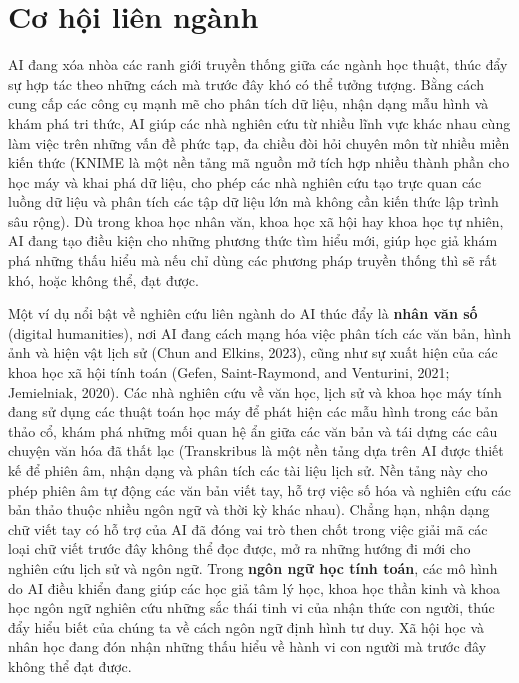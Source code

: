 \section{Cơ hội liên ngành}

AI đang xóa nhòa các ranh giới truyền thống giữa các ngành học thuật, thúc đẩy sự hợp tác theo những cách mà trước đây khó có thể tưởng tượng. Bằng cách cung cấp các công cụ mạnh mẽ cho phân tích dữ liệu, nhận dạng mẫu hình và khám phá tri thức, AI giúp các nhà nghiên cứu từ nhiều lĩnh vực khác nhau cùng làm việc trên những vấn đề phức tạp, đa chiều đòi hỏi chuyên môn từ nhiều miền kiến thức (KNIME là một nền tảng mã nguồn mở tích hợp nhiều thành phần cho học máy và khai phá dữ liệu, cho phép các nhà nghiên cứu tạo trực quan các luồng dữ liệu và phân tích các tập dữ liệu lớn mà không cần kiến thức lập trình sâu rộng). Dù trong khoa học nhân văn, khoa học xã hội hay khoa học tự nhiên, AI đang tạo điều kiện cho những phương thức tìm hiểu mới, giúp học giả khám phá những thấu hiểu mà nếu chỉ dùng các phương pháp truyền thống thì sẽ rất khó, hoặc không thể, đạt được.

Một ví dụ nổi bật về nghiên cứu liên ngành do AI thúc đẩy là \textbf{nhân văn số} (digital humanities), nơi AI đang cách mạng hóa việc phân tích các văn bản, hình ảnh và hiện vật lịch sử (Chun and Elkins, 2023), cũng như sự xuất hiện của các khoa học xã hội tính toán (Gefen, Saint-Raymond, and Venturini, 2021; Jemielniak, 2020). Các nhà nghiên cứu về văn học, lịch sử và khoa học máy tính đang sử dụng các thuật toán học máy để phát hiện các mẫu hình trong các bản thảo cổ, khám phá những mối quan hệ ẩn giữa các văn bản và tái dựng các câu chuyện văn hóa đã thất lạc (Transkribus là một nền tảng dựa trên AI được thiết kế để phiên âm, nhận dạng và phân tích các tài liệu lịch sử. Nền tảng này cho phép phiên âm tự động các văn bản viết tay, hỗ trợ việc số hóa và nghiên cứu các bản thảo thuộc nhiều ngôn ngữ và thời kỳ khác nhau). Chẳng hạn, nhận dạng chữ viết tay có hỗ trợ của AI đã đóng vai trò then chốt trong việc giải mã các loại chữ viết trước đây không thể đọc được, mở ra những hướng đi mới cho nghiên cứu lịch sử và ngôn ngữ. Trong \textbf{ngôn ngữ học tính toán}, các mô hình do AI điều khiển đang giúp các học giả tâm lý học, khoa học thần kinh và khoa học ngôn ngữ nghiên cứu những sắc thái tinh vi của nhận thức con người, thúc đẩy hiểu biết của chúng ta về cách ngôn ngữ định hình tư duy. Xã hội học và nhân học đang đón nhận những thấu hiểu về hành vi con người mà trước đây không thể đạt được.

